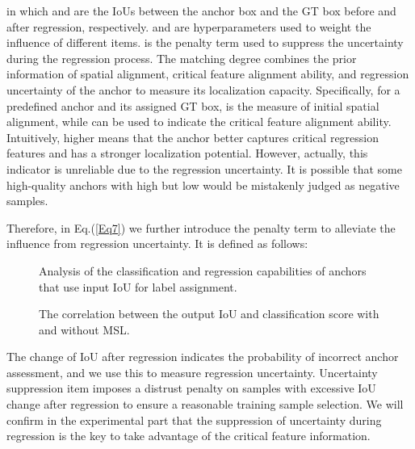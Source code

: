 \documentclass[journal]{IEEEtran}
\begin{document}
in which  and  are the IoUs between the anchor box and the GT box before and after regression, respectively.  and  are hyperparameters used to weight the influence of different items.  is the penalty term used to suppress the uncertainty during the regression process. The matching degree combines the prior information of spatial alignment, critical feature alignment ability, and regression uncertainty of the anchor to measure its localization capacity. Specifically, for a predefined anchor and its assigned GT box,  is the measure of initial spatial alignment, while  can be used to indicate the critical feature alignment ability. Intuitively, higher  means that the anchor better captures critical regression features and has a stronger localization potential. However, actually, this indicator is unreliable due to the regression uncertainty. It is possible that some high-quality anchors with high  but low  would be mistakenly judged as negative samples\cite{ming2020dynamic}.

Therefore, in Eq.(\ref{Eq7}) we further introduce the penalty term  to alleviate the influence from regression uncertainty. It is defined as follows:


\begin{figure}[t]
	\centering
	\hspace{2mm}
	\caption{Analysis of the classification and regression capabilities of anchors that use input IoU for label assignment.}
	\label{Fig7}
\end{figure}

\begin{figure}[t]
	\hspace{2mm}
	\caption{ The correlation between the output IoU and classification score with and without MSL.}
	\label{Fig8}
\end{figure}


The change of IoU after regression indicates the probability of incorrect anchor assessment, and we use this to measure regression uncertainty. Uncertainty suppression item  imposes a distrust penalty on samples with excessive IoU change after regression to ensure a reasonable training sample selection. We will confirm in the experimental part that the suppression of uncertainty during regression is the key to take advantage of the critical feature information. 
\end{document}

